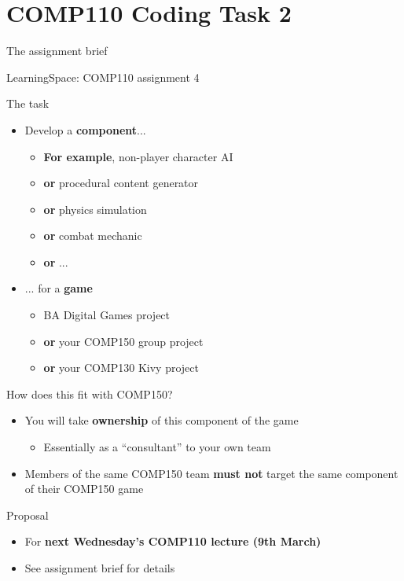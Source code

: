 \part{COMP110 Coding Task 2}
\frame{\partpage}

\begin{frame}{The assignment brief}
\begin{center}
    LearningSpace: COMP110 assignment 4
\end{center}
\end{frame}

\begin{frame}{The task}
    \begin{itemize}
        \item Develop a \textbf{component}... \pause
            \begin{itemize}
                \item \textbf{For example}, non-player character AI
                \item \textbf{or} procedural content generator
                \item \textbf{or} physics simulation
                \item \textbf{or} combat mechanic
                \item \textbf{or} ...
            \end{itemize} \pause
        \item ... for a \textbf{game} \pause
            \begin{itemize}
                \item BA Digital Games project
                \item \textbf{or} your COMP150 group project
                \item \textbf{or} your COMP130 Kivy project
            \end{itemize}
    \end{itemize}
\end{frame}

\begin{frame}{How does this fit with COMP150?}
    \begin{itemize}
        \item You will take \textbf{ownership} of this component of the game \pause
            \begin{itemize}
                \item Essentially as a ``consultant'' to your own team
            \end{itemize} \pause
        \item Members of the same COMP150 team \textbf{must not} target the same component of their COMP150 game
    \end{itemize}
\end{frame}

\begin{frame}{Proposal}
    \begin{itemize}
        \item For \textbf{next Wednesday's COMP110 lecture (9th March)}
        \item See assignment brief for details
    \end{itemize}
\end{frame}

